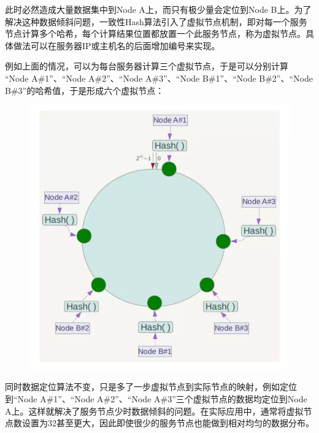 \documentclass[12pt]{article}
\begin{document}
此时必然造成大量数据集中到Node A上，而只有极少量会定位到Node B上。为了解决这种数据倾斜问题，一致性Hash算法引入了虚拟节点机制，即对每一个服务节点计算多个哈希，每个计算结果位置都放置一个此服务节点，称为虚拟节点。具体做法可以在服务器IP或主机名的后面增加编号来实现。

例如上面的情况，可以为每台服务器计算三个虚拟节点，于是可以分别计算 “Node A\#1”、“Node A\#2”、“Node A\#3”、“Node B\#1”、“Node B\#2”、“Node B\#3”的哈希值，于是形成六个虚拟节点：
\begin{figure}[H]
    \centering
    \includegraphics[width=.5\textwidth]{fig/Consistent_Hashing_11.jpg}
\end{figure}

同时数据定位算法不变，只是多了一步虚拟节点到实际节点的映射，例如定位到“Node A\#1”、“Node A\#2”、“Node A\#3”三个虚拟节点的数据均定位到Node A上。这样就解决了服务节点少时数据倾斜的问题。在实际应用中，通常将虚拟节点数设置为32甚至更大，因此即使很少的服务节点也能做到相对均匀的数据分布。





\end{document}
